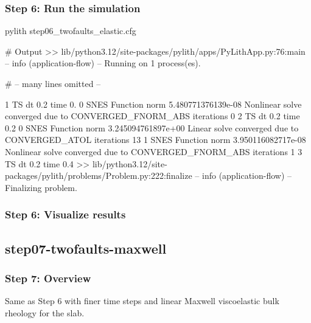 \documentclass[aspectratio=169]{beamer}
\begin{document}
\begin{frame}[fragile]
  \frametitle{Step 6: Run the simulation}
  \summary{}

\begin{pyrejournal}
pylith step06_twofaults_elastic.cfg

# Output
 >> lib/python3.12/site-packages/pylith/apps/PyLithApp.py:76:main
 -- info (application-flow)
 -- Running on 1 process(es).

# -- many lines omitted --

1 TS dt 0.2 time 0.
    0 SNES Function norm 5.480771376139e-08
    Nonlinear solve converged due to CONVERGED_FNORM_ABS iterations 0
2 TS dt 0.2 time 0.2
    0 SNES Function norm 3.245094761897e+00
      Linear solve converged due to CONVERGED_ATOL iterations 13
    1 SNES Function norm 3.950116082717e-08
    Nonlinear solve converged due to CONVERGED_FNORM_ABS iterations 1
3 TS dt 0.2 time 0.4
 >> lib/python3.12/site-packages/pylith/problems/Problem.py:222:finalize
 -- info (application-flow)
 -- Finalizing problem.
\end{pyrejournal}
  
\end{frame}


\begin{frame}
  \frametitle{Step 6: Visualize results}

    
\end{frame}


\subsection{step07-twofaults-maxwell}

\begin{frame}
  \frametitle{Step 7: Overview}

  Same as Step 6 with finer time steps and linear Maxwell viscoelastic bulk rheology for the slab.
      
\end{frame}
\end{document}
